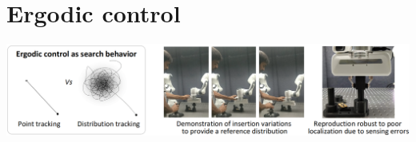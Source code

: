 \documentclass[10pt,a4paper]{article} %
\newcommand{\trsp}{{\scriptscriptstyle\top}}
\begin{document}



\section{Ergodic control}\label{sec:ergodicControl}

\begin{center}
\includegraphics[width=.7\columnwidth]{images/ergodic01.png}
\end{center}
\end{document}
